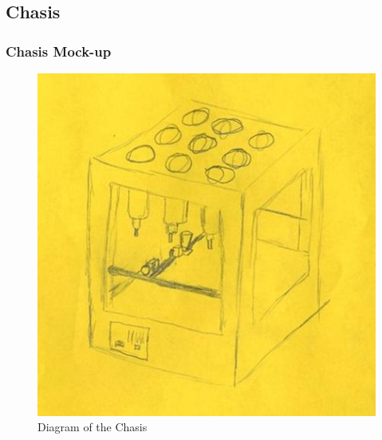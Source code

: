 \subsection{Chasis}
\begin{frame}
    \frametitle{Chasis Mock-up}
    \begin{figure}[htb]
        \centering
        \includegraphics[width=0.6\textheight]{Images/ChasisMockup.png}
        \caption{Diagram of the Chasis}
        \label{fig:ChasisMockUp}
    \end{figure}
\end{frame}

